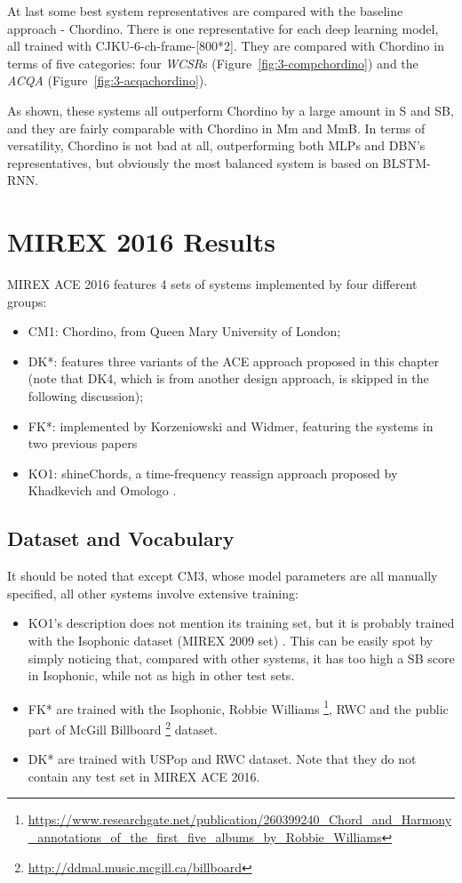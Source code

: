 At last some best system representatives are compared with the baseline approach - Chordino. There is one representative for each deep learning model, all trained with CJKU-6-ch-frame-[800*2]. They are compared with Chordino in terms of five categories: four \textit{WCSR}s (Figure~\ref{fig:3-compchordino}) and the \textit{ACQA} (Figure~\ref{fig:3-acqachordino}).

As shown, these systems all outperform Chordino by a large amount in S and SB, and they are fairly comparable with Chordino in Mm and MmB. In terms of versatility, Chordino is not bad at all, outperforming both MLPs and DBN's representatives, but obviously the most balanced system is based on BLSTM-RNN.

\section{MIREX 2016 Results}
MIREX ACE 2016 features 4 sets of systems implemented by four different groups:
\begin{itemize}
\item CM1: Chordino, from Queen Mary University of London;
\item DK*: features three variants of the ACE approach proposed in this chapter (note that DK4, which is from another design approach, is skipped in the following discussion);
\item FK*: implemented by Korzeniowski and Widmer, featuring the systems in two previous papers \cite{Korzeniowski2016feature,Korzeniowski2016convolutional}
\item KO1: shineChords, a time-frequency reassign approach proposed by Khadkevich and Omologo \cite{khadkevich2011time}.
\end{itemize}

\subsection{Dataset and Vocabulary}
It should be noted that except CM3, whose model parameters are all manually specified, all other systems involve extensive training:
\begin{itemize}
\item KO1's description does not mention its training set, but it is probably trained with the Isophonic dataset (MIREX 2009 set) \cite{burgoyne2014comparative}. This can be easily spot by simply noticing that, compared with other systems, it has too high a SB score in Isophonic, while not as high in other test sets.

\item FK* are trained with the Isophonic, Robbie Williams \footnote{\url{https://www.researchgate.net/publication/260399240\_Chord\_and\_Harmony\_annotations\_of\_the\_first\_five\_albums\_by\_Robbie\_Williams}}, RWC and the public part of McGill Billboard \footnote{\url{http://ddmal.music.mcgill.ca/billboard}} dataset.

\item DK* are trained with USPop and RWC dataset. Note that they do not contain any test set in MIREX ACE 2016.
\end{itemize}

